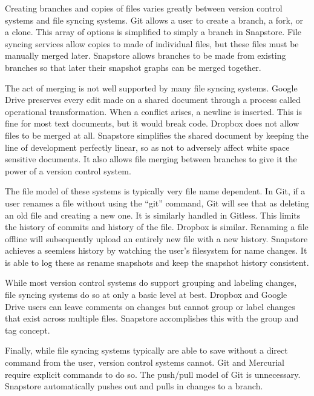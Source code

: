 Creating branches and copies of files varies greatly between version control systems and file syncing systems. Git allows a user to create a branch, a fork, or a clone. This array of options is simplified to simply a branch in Snapstore. File syncing services allow copies to made of individual files, but these files must be manually merged later. Snapstore allows branches to be made from existing branches so that later their snapshot graphs can be merged together.

The act of merging is not well supported by many file syncing systems. Google Drive preserves every edit made on a shared document through a process called operational transformation. When a conflict arises, a newline is inserted. This is fine for most text documents, but it would break code. Dropbox does not allow files to be merged at all. Snapstore simplifies the shared document by keeping the line of development perfectly linear, so as not to adversely affect white space sensitive documents. It also allows file merging between branches to give it the power of a version control system.

The file model of these systems is typically very file name dependent. In Git, if a user renames a file without using the ``git'' command, Git will see that as deleting an old file and creating a new one. It is similarly handled in Gitless. This limits the history of commits and history of the file. Dropbox is similar. Renaming a file offline will subsequently upload an entirely new file with a new history. Snapstore achieves a seemless history by watching the user's filesystem for name changes. It is able to log these as rename snapshots and keep the snapshot history consistent.

While most version control systems do support grouping and labeling changes, file syncing systems do so at only a basic level at best. Dropbox and Google Drive users can leave comments on changes but cannot group or label changes that exist across multiple files. Snapstore accomplishes this with the group and tag concept.

Finally, while file syncing systems typically are able to save without a direct command from the user, version control systems cannot. Git and Mercurial require explicit commands to do so. The push/pull model of Git is unnecessary. Snapstore automatically pushes out and pulls in changes to a branch.




